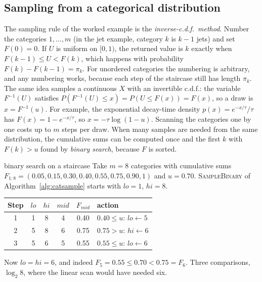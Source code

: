 \documentclass[11pt]{article}
\begin{document}
\subsection{Sampling from a categorical distribution}\label{sec:catsample}

The sampling rule of the worked example is the \emph{inverse-c.d.f.\ method}. Number the categories $1, \dots, m$
(in the jet example, category $k$ is $k - 1$ jets) and set $F(0) = 0$. If $U$ is uniform on $[0,1)$, the
returned value is $k$ exactly when $F(k-1) \le U < F(k)$, which happens with probability $F(k) - F(k-1) = \pi_k$. For unordered categories the numbering is arbitrary,
and any numbering works, because each step of the staircase still has length $\pi_k$. The same idea samples a
continuous $X$ with an invertible c.d.f.: the variable $F^{-1}(U)$ satisfies $P(F^{-1}(U) \le x) = P(U \le F(x)) = F(x)$, so a draw is $x = F^{-1}(u)$. For
example, the exponential decay-time density $p(x) = e^{-x/\tau}/\tau$ has $F(x) = 1 - e^{-x/\tau}$, so
$x = -\tau\log(1 - u)$.
Scanning the categories one by one costs up to $m$ steps per draw. When many samples are needed from the same
distribution, the cumulative sums can be computed once and the first $k$ with $F(k) > u$ found by \emph{binary
search}, because $F$ is sorted.

\begin{worked}{binary search on a staircase}
Take $m = 8$ categories with cumulative sums $F_{1:8} = (0.05, 0.15, 0.30, 0.40, 0.55, 0.75, 0.90, 1)$ and $u = 0.70$.
\textsc{SampleBinary} of Algorithm~\ref{alg:catsample} starts with $lo = 1$, $hi = 8$.
\begin{center}\small
\begin{tabular}{@{}cccccl@{}}\toprule
Step & $lo$ & $hi$ & $mid$ & $F_{mid}$ & action \\ \midrule
1 & 1 & 8 & 4 & 0.40 & $0.40 \le u$: $lo \gets 5$ \\
2 & 5 & 8 & 6 & 0.75 & $0.75 > u$: $hi \gets 6$ \\
3 & 5 & 6 & 5 & 0.55 & $0.55 \le u$: $lo \gets 6$ \\ \bottomrule
\end{tabular}
\end{center}
Now $lo = hi = 6$, and indeed $F_5 = 0.55 \le 0.70 < 0.75 = F_6$. Three comparisons, $\log_2 8$, where the linear
scan would have needed six.
\end{worked}
\end{document}
